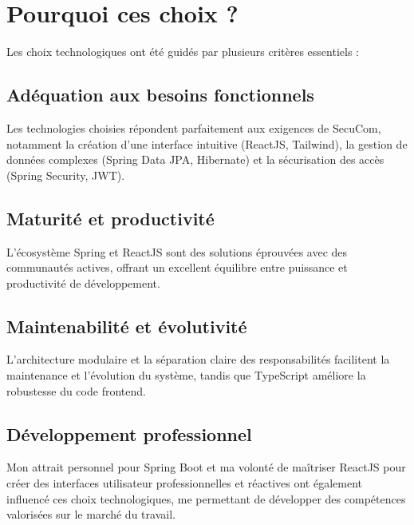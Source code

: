 \section{Pourquoi ces choix ?}

Les choix technologiques ont été guidés par plusieurs critères essentiels :

\subsection{Adéquation aux besoins fonctionnels}

Les technologies choisies répondent parfaitement aux exigences de SecuCom, notamment la création d'une interface intuitive (ReactJS, Tailwind), la gestion de données complexes (Spring Data JPA, Hibernate) et la sécurisation des accès (Spring Security, JWT).

\subsection{Maturité et productivité}

L'écosystème Spring et ReactJS sont des solutions éprouvées avec des communautés actives, offrant un excellent équilibre entre puissance et productivité de développement.

\subsection{Maintenabilité et évolutivité}

L'architecture modulaire et la séparation claire des responsabilités facilitent la maintenance et l'évolution du système, tandis que TypeScript améliore la robustesse du code frontend.

\subsection{Développement professionnel}

Mon attrait personnel pour Spring Boot et ma volonté de maîtriser ReactJS pour créer des interfaces utilisateur professionnelles et réactives ont également influencé ces choix technologiques, me permettant de développer des compétences valorisées sur le marché du travail.
